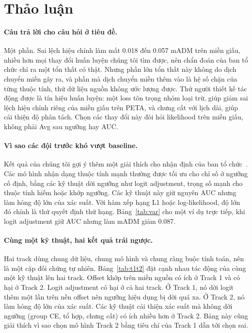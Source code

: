 \documentclass[11pt,a4paper]{article}
\begin{document}
\section{Thảo luận}
\label{sec:disc}

\paragraph{Câu trả lời cho câu hỏi ở tiêu đề.} Một phần. Sai lệch hiệu chỉnh làm mất 0.018 đến 0.057 mADM trên miền giấu, nhiều hơn mọi thay đổi huấn luyện chúng tôi tìm được, nên chẩn đoán của ban tổ chức chỉ ra một tổn thất có thật. Nhưng phần lớn tổn thất này không do dịch chuyển miền gây ra, và phần mà dịch chuyển miền thêm vào là hệ số chặn của từng thuộc tính, thứ dữ liệu nguồn không ước lượng được. Thứ người thiết kế tác động được là tín hiệu huấn luyện: một loss tôn trọng nhóm loại trừ, giúp giảm sai lệch hiệu chỉnh riêng của miền giấu trên PETA, và chưng cất với lịch dài, giúp cải thiện độ phân tách. Chọn các thay đổi này đòi hỏi likelihood trên miền giấu, không phải Avg sau ngưỡng hay AUC.

\paragraph{Vì sao các đội trước khó vượt baseline.} Kết quả của chúng tôi gợi ý thêm một giải thích cho nhận định của ban tổ chức~\cite{upar24}. Các mô hình nhận dạng thuộc tính mạnh thường được tối ưu cho chỉ số ở ngưỡng cố định, bằng các kỹ thuật dời ngưỡng như logit adjustment, trọng số mạnh cho thuộc tính hiếm hoặc khớp ngưỡng. Các kỹ thuật này giữ nguyên AUC nhưng làm hỏng độ lớn của xác suất. Với hàm xếp hạng L1 hoặc log-likelihood, độ lớn đó chính là thứ quyết định thứ hạng. Bảng~\ref{tab:var} cho một ví dụ trực tiếp, khi logit adjustment giữ AUC nhưng làm mADM giảm 0.087.

\paragraph{Cùng một kỹ thuật, hai kết quả trái ngược.} Hai track dùng chung dữ liệu, chung mô hình và chung ràng buộc tính toán, nên là một cặp đối chứng tự nhiên. Bảng~\ref{tab:t1t2} đặt cạnh nhau tác động của cùng một kỹ thuật lên hai track. Offset khớp trên miền nguồn có ích ở Track 1 và có hại ở Track 2. Logit adjustment có hại ở cả hai track. Ở Track 1, nó dời logit thêm một lần trên nền offset nên ngưỡng hiệu dụng bị dời quá xa. Ở Track 2, nó làm hỏng độ lớn của xác suất. Các kỹ thuật cải thiện xác suất mà không dời ngưỡng (group CE, tổ hợp, chưng cất) có ích nhiều hơn ở Track 2. Bảng này cũng giải thích vì sao chọn mô hình Track 2 bằng tiêu chí của Track 1 dẫn tới chọn sai.
\end{document}
